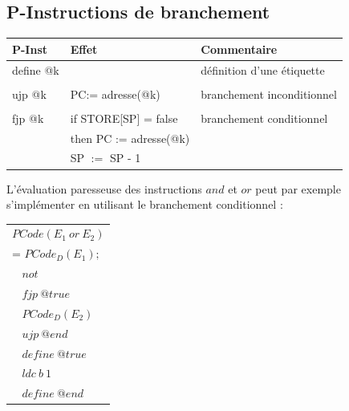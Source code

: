 \documentclass[french,11pt,twoside]{article}
\begin{document}
\subsection{P-Instructions de branchement}

\begin{tabular}{|l|l|l|}
\hline
P-Inst                     & Effet                                 & Commentaire\\
\hline
define @k               &                                         & définition d'une étiquette\\
& & \\
ujp @k                    & PC:= adresse(@k)            & branchement inconditionnel\\
& & \\
fjp @k                    & if STORE[SP] = false          & branchement conditionnel\\
                              & then PC := adresse(@k)    &\\
			                  & SP $:=$ SP - 1                  & \\
\hline
\end{tabular}

L'évaluation paresseuse des instructions $and$ et $or$ peut par exemple s'implémenter en utilisant le branchement conditionnel :\\


\begin{tabular}{l}
$PCode(E_1\ or\ E_2)$\\
\hspace{1cm} =  $PCode_D(E_1);$ \\
\hspace{1cm}$\ \ \ \ not  $\\
\hspace{1cm}$\ \ \ \ fjp\ @true$\\
\hspace{1cm}$\ \ \ \ PCode_D(E_2)  $\\
\hspace{1cm}$\ \ \ \ ujp\ @end$\\
\hspace{1cm}$\ \ \ \ define\ @true$\\
\hspace{1cm}$\ \ \ \ ldc\ b\ 1$\\
\hspace{1cm}$\ \ \ \ define\ @end$\\
\end{tabular}
\\
\end{document}
